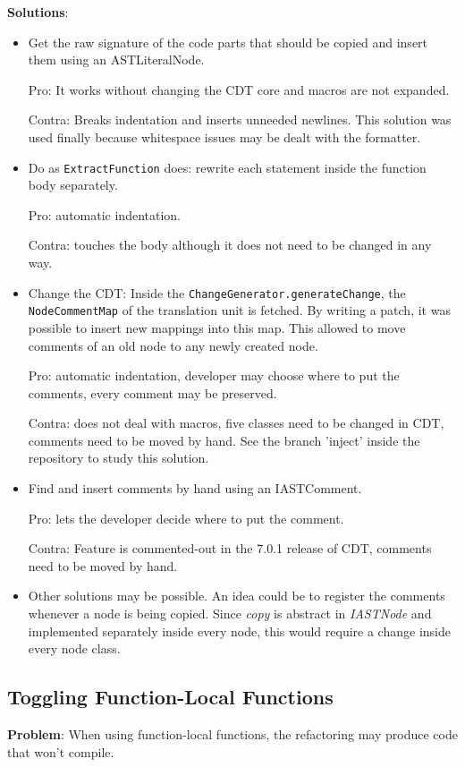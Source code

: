 \textbf{Solutions}:
\begin{itemize}
\item Get the raw signature of the code parts that should be copied and insert 
them using an ASTLiteralNode. 

Pro: It works without changing the CDT core and macros are not expanded. 

Contra: Breaks indentation and inserts unneeded newlines. This solution was used 
finally because whitespace issues may be dealt with the formatter.
\item Do as \texttt{ExtractFunction} does: rewrite each statement inside the 
function body separately. 

Pro: automatic indentation. 

Contra: touches the body although it does not need to be changed in any way. 
\item Change the CDT: Inside the \texttt{ChangeGenerator.generateChange}, the 
\texttt{NodeCommentMap} of the translation unit is fetched. By writing a patch, 
it was possible to insert new mappings into this map. This allowed to move 
comments of an old node to any newly created node. 

Pro: automatic indentation, developer may choose where to put the comments, 
every comment may be preserved. 

Contra: does not deal with macros, five classes need to be changed in CDT, 
comments need to be moved by hand. See the branch 'inject' inside the repository 
to study this solution.
\item Find and insert comments by hand using an IASTComment. 

Pro: lets the developer decide where to put the comment. 

Contra: Feature is commented-out in the 7.0.1 release of CDT, comments need to 
be moved by hand.
\item Other solutions may be possible. An idea could be to register the comments 
whenever a node is being copied. Since \textit{copy} is abstract in 
\textit{IASTNode} and implemented separately inside every node, this would 
require a change inside every node class.
\end{itemize}

\subsection{Toggling Function-Local Functions}
\textbf{Problem}: When using function-local functions, the refactoring may 
produce code that won't compile.

